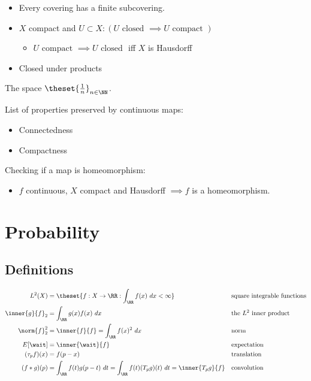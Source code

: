 \begin{itemize}
  \begin{itemize}
  \tightlist
  \item
    Every covering has a finite subcovering.
  \item
    \(X\) compact and
    \(U \subset X: (U \text{ closed } \implies U \text{ compact })\)

    \begin{itemize}
    \tightlist
    \item
      \(U \text{ compact } \implies U \text{ closed }\) iff \(X\) is
      Hausdorff
    \end{itemize}
  \item
    Closed under products
  \end{itemize}
\end{itemize}

\begin{example}[?]

The space \(\theset{\frac{1}{n}}_{n\in \NN}\).

\end{example}

List of properties preserved by continuous maps:

\begin{itemize}
\tightlist
\item
  Connectedness
\item
  Compactness
\end{itemize}

Checking if a map is homeomorphism:

\begin{itemize}
\tightlist
\item
  \(f\) continuous, \(X\) compact and Hausdorff \(\implies f\) is a
  homeomorphism.
\end{itemize}

\hypertarget{probability}{%
\section{Probability}\label{probability}}

\hypertarget{definitions-2}{%
\subsection{Definitions}\label{definitions-2}}

\begin{align*}
L^2(X) &= \theset{f: X \to \RR: \int_\RR f(x) ~dx < \infty} 
&&\text{square integrable functions}\\
\inner{g}{f}_{2} &= \int_\RR g(x)f(x) ~dx 
&&\text{the } L^2 \text{ inner product}\\
\norm{f}_2^2 &= \inner{f}{f} = \int_\RR f(x)^2 ~dx
&&\text{norm}\\
E[\wait] &= \inner{\wait}{f} 
&&\text{expectation}\\
(\tau_{p}f)(x) &= f(p- x) 
&&\text{translation}\\
(f \ast g)(p) &= \int_\RR f(t)g(p-t)~dt = \int_\RR f(t)(T_{p}g)(t) ~dt = \inner{T_pg}{f} 
&&\text{convolution}\\
\end{align*}

